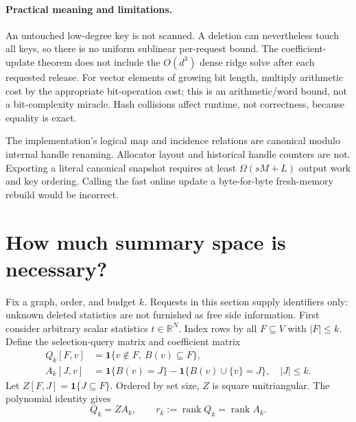 \documentclass[11pt,a4paper]{article}
\theoremstyle{definition}\newtheorem{definition}[theorem]{Definition}
\newcommand{\R}{\mathbb R}\newcommand{\E}{\mathbb E}\newcommand{\1}{\mathbf 1}
\begin{document}
\paragraph{Practical meaning and limitations.} An untouched low-degree key is not scanned. A deletion can nevertheless touch all keys, so there is no uniform sublinear per-request bound. The coefficient-update theorem does not include the $O(d^3)$ dense ridge solve after each requested release. For vector elements of growing bit length, multiply arithmetic cost by the appropriate bit-operation cost; this is an arithmetic/word bound, not a bit-complexity miracle. Hash collisions affect runtime, not correctness, because equality is exact.

The implementation's logical map and incidence relations are canonical modulo internal handle renaming. Allocator layout and historical handle counters are not. Exporting a literal canonical snapshot requires at least $\Omega(sM+L)$ output work and key ordering. Calling the fast online update a byte-for-byte fresh-memory rebuild would be incorrect.

\section{How much summary space is necessary?}\label{sec:rank}
Fix a graph, order, and budget $k$. Requests in this section supply identifiers only: unknown deleted statistics are not furnished as free side information. First consider arbitrary scalar statistics $t\in\R^N$. Index rows by all $F\subseteq V$ with $|F|\le k$. Define the selection-query matrix and coefficient matrix
\begin{align}
 Q_k[F,v]&=\1\{v\notin F,\ B(v)\subseteq F\},\\
 A_k[J,v]&=\1\{B(v)=J\}-\1\{B(v)\cup\{v\}=J\},\quad |J|\le k.
\end{align}
Let $Z[F,J]=\1\{J\subseteq F\}$. Ordered by set size, $Z$ is square unitriangular. The polynomial identity gives
\begin{equation}
 Q_k=ZA_k,\qquad r_k:=\operatorname{rank}Q_k=\operatorname{rank}A_k.
\end{equation}
\end{document}
